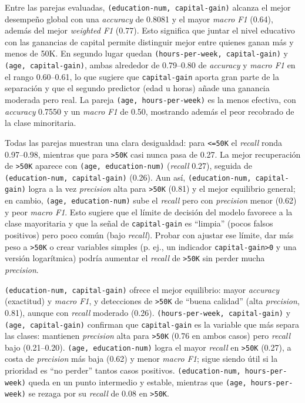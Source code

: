 \documentclass[12pt,a4paper]{article}
\begin{document}
\begin{enumerate}
\begin{itemize}
      Entre las parejas evaluadas, \texttt{(education-num, capital-gain)} alcanza el mejor desempeño global con una \emph{accuracy} de 0.8081 
      y el mayor \emph{macro F1} (0.64), además del mejor \emph{weighted F1} (0.77). Esto significa que juntar el nivel educativo con las ganancias de capital 
      permite distinguir mejor entre quienes ganan más y menos de 50K. En segundo lugar quedan \texttt{(hours-per-week, capital-gain)} y 
      \texttt{(age, capital-gain)}, ambas alrededor de 0.79–0.80 de \emph{accuracy} y \emph{macro F1} en el rango 0.60–0.61, lo que sugiere que 
      \texttt{capital-gain} aporta gran parte de la separación y que el segundo predictor (edad u horas) añade una ganancia moderada pero real. 
      La pareja \texttt{(age, hours-per-week)} es la menos efectiva, con \emph{accuracy} 0.7550 y un \emph{macro F1} de 0.50, mostrando además el 
      peor recobrado de la clase minoritaria.

      Todas las parejas muestran una clara desigualdad: para \texttt{<=50K} el \emph{recall} ronda 0.97–0.98, mientras que para \texttt{>50K} casi nunca 
      pasa de 0.27. La mejor recuperación de \texttt{>50K} aparece con \texttt{(age, education-num)} (\emph{recall} 0.27), seguida de \texttt{(education-num, capital-gain)} 
      (0.26). Aun así, \texttt{(education-num, capital-gain)} logra a la vez \emph{precision} alta para \texttt{>50K} (0.81) y el mejor equilibrio general; en cambio, 
      \texttt{(age, education-num)} sube el \emph{recall} pero con \emph{precision} menor (0.62) y peor \emph{macro F1}. Esto sugiere que el límite de decisión del modelo 
      favorece a la clase mayoritaria y que la señal de \texttt{capital-gain} es “limpia” (pocos falsos positivos) pero poco común (bajo \emph{recall}). Probar con ajustar 
      ese límite, dar más peso a \texttt{>50K} o crear variables simples (p. ej., un indicador \texttt{capital-gain>0} y una versión logarítmica) podría aumentar el \emph{recall} 
      de \texttt{>50K} sin perder mucha \emph{precision}.

      \texttt{(education-num, capital-gain)} ofrece el mejor equilibrio: mayor \emph{accuracy} (exactitud) y \emph{macro F1}, y detecciones de \texttt{>50K} de 
      “buena calidad” (alta \emph{precision}, 0.81), aunque con \emph{recall} moderado (0.26). \texttt{(hours-per-week, capital-gain)} y \texttt{(age, capital-gain)} 
      confirman que \texttt{capital-gain} es la variable que más separa las clases: mantienen \emph{precision} alta para \texttt{>50K} (0.76 en ambos casos) pero 
      \emph{recall} bajo (0.21–0.20). \texttt{(age, education-num)} logra el mayor \emph{recall} en \texttt{>50K} (0.27), a costa de \emph{precision} más baja (0.62) y 
      menor \emph{macro F1}; sigue siendo útil si la prioridad es “no perder” tantos casos positivos. \texttt{(education-num, hours-per-week)} queda en un punto intermedio y 
      estable, mientras que \texttt{(age, hours-per-week)} se rezaga por su \emph{recall} de 0.08 en \texttt{>50K}.


\end{itemize}
\end{enumerate}
\end{document}
